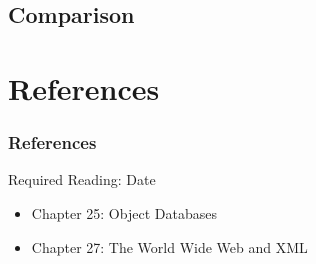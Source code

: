 \documentclass[dvipsnames]{beamer}
\theoremstyle{plain}
\begin{document}
\subsection{Comparison}

\section*{References}

\begin{frame}
  \frametitle{References}

  \begin{block}{Required Reading: Date}
    \begin{itemize}
      \item Chapter 25: \alert{Object Databases}
      \item Chapter 27: \alert{The World Wide Web and XML}
    \end{itemize}
  \end{block}
\end{frame}
\end{document}
